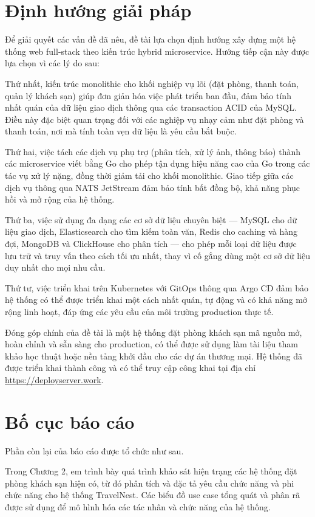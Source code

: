 \documentclass[13pt,a4paper,twoside]{report}
\begin{document}
\section{Định hướng giải pháp}

Để giải quyết các vấn đề đã nêu, đề tài lựa chọn định hướng xây dựng một hệ thống web full-stack theo kiến trúc hybrid microservice. Hướng tiếp cận này được lựa chọn vì các lý do sau:

Thứ nhất, kiến trúc monolithic cho khối nghiệp vụ lõi (đặt phòng, thanh toán, quản lý khách sạn) giúp đơn giản hóa việc phát triển ban đầu, đảm bảo tính nhất quán của dữ liệu giao dịch thông qua các transaction ACID của MySQL. Điều này đặc biệt quan trọng đối với các nghiệp vụ nhạy cảm như đặt phòng và thanh toán, nơi mà tính toàn vẹn dữ liệu là yêu cầu bắt buộc.

Thứ hai, việc tách các dịch vụ phụ trợ (phân tích, xử lý ảnh, thông báo) thành các microservice viết bằng Go cho phép tận dụng hiệu năng cao của Go trong các tác vụ xử lý nặng, đồng thời giảm tải cho khối monolithic. Giao tiếp giữa các dịch vụ thông qua NATS JetStream đảm bảo tính bất đồng bộ, khả năng phục hồi và mở rộng của hệ thống.

Thứ ba, việc sử dụng đa dạng các cơ sở dữ liệu chuyên biệt --- MySQL cho dữ liệu giao dịch, Elasticsearch cho tìm kiếm toàn văn, Redis cho caching và hàng đợi, MongoDB và ClickHouse cho phân tích --- cho phép mỗi loại dữ liệu được lưu trữ và truy vấn theo cách tối ưu nhất, thay vì cố gắng dùng một cơ sở dữ liệu duy nhất cho mọi nhu cầu.

Thứ tư, việc triển khai trên Kubernetes với GitOps thông qua Argo CD đảm bảo hệ thống có thể được triển khai một cách nhất quán, tự động và có khả năng mở rộng linh hoạt, đáp ứng các yêu cầu của môi trường production thực tế.

Đóng góp chính của đề tài là một hệ thống đặt phòng khách sạn mã nguồn mở, hoàn chỉnh và sẵn sàng cho production, có thể được sử dụng làm tài liệu tham khảo học thuật hoặc nền tảng khởi đầu cho các dự án thương mại. Hệ thống đã được triển khai thành công và có thể truy cập công khai tại địa chỉ \url{https://deployserver.work}.

\section{Bố cục báo cáo}

Phần còn lại của báo cáo được tổ chức như sau.

Trong Chương 2, em trình bày quá trình khảo sát hiện trạng các hệ thống đặt phòng khách sạn hiện có, từ đó phân tích và đặc tả yêu cầu chức năng và phi chức năng cho hệ thống TravelNest. Các biểu đồ use case tổng quát và phân rã được sử dụng để mô hình hóa các tác nhân và chức năng của hệ thống.
\end{document}
